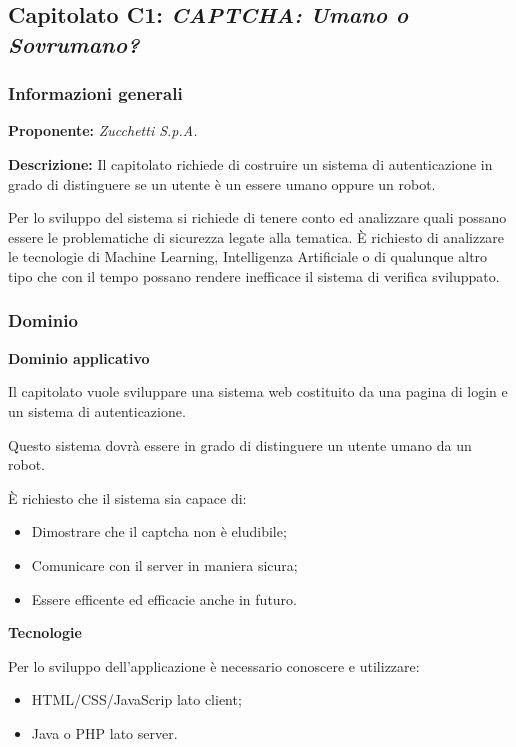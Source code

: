 \subsection{Capitolato C1: \textit{CAPTCHA: Umano o Sovrumano?}}

\subsubsection{Informazioni generali}

\textbf{Proponente:} \textit{Zucchetti S.p.A.}

\textbf{Descrizione:}
Il capitolato richiede di costruire un sistema di autenticazione in grado di distinguere se un utente è un essere umano oppure un robot.

Per lo sviluppo del sistema si richiede di tenere conto ed analizzare quali possano essere le problematiche di sicurezza legate alla tematica. È richiesto di analizzare le tecnologie di Machine Learning, Intelligenza Artificiale o di qualunque altro tipo che con il tempo possano rendere inefficace il sistema di verifica sviluppato.

\subsubsection{Dominio}

\textbf{Dominio applicativo}

Il capitolato vuole sviluppare una sistema web costituito da una pagina di login e un sistema di autenticazione.

Questo sistema dovrà essere in grado di distinguere un utente umano da un robot.

È richiesto che il sistema sia capace di:
\begin{itemize}
    \item Dimostrare che il captcha non è eludibile;
    \item Comunicare con il server in maniera sicura;
    \item Essere efficente ed efficacie anche in futuro.
\end{itemize}

\textbf{Tecnologie}

Per lo sviluppo dell'applicazione è necessario conoscere e utilizzare:
\begin{itemize}
    \item HTML/CSS/JavaScrip lato client;
    \item Java o PHP lato server.
\end{itemize}

